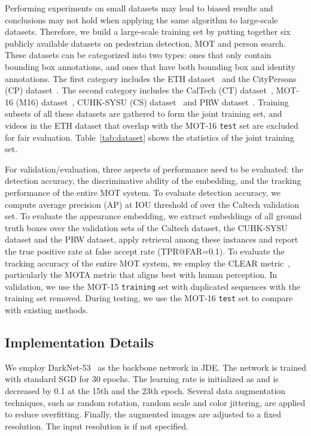 \documentclass[runningheads]{llncs}
\begin{document}
Performing experiments on small datasets may lead to biased results and conclusions may not hold when applying the same algorithm to large-scale datasets. 
Therefore, we build a large-scale training set by putting together six publicly available  datasets on pedestrian detection, MOT and person search. These datasets can be categorized into two types: ones that only contain bounding box annotations, and ones that have both bounding box and identity annotations. The first category includes the ETH dataset~\cite{eth} and the CityPersons (CP) dataset~\cite{citypersons}. The second category includes the CalTech (CT) dataset~\cite{caltech}, MOT-16 (M16) dataset~\cite{mot16}, CUHK-SYSU (CS) dataset~\cite{personsearch} and PRW dataset~\cite{prw}. Training subsets of all these datasets are gathered to form the joint training set, and videos in the ETH dataset that overlap with the MOT-16 \texttt{test} set are excluded for fair evaluation. 
Table~\ref{tab:dataset} shows the statistics of the joint training set.

For validation/evaluation, three aspects of performance need to be evaluated: the detection accuracy, the discriminative ability of the embedding, and the tracking performance of the entire MOT system. To evaluate detection accuracy, we compute average precision (AP) at IOU threshold of  over the Caltech validation set. To evaluate the appearance embedding, we extract embeddings of all ground truth boxes over the validation sets of the Caltech dataset, the CUHK-SYSU dataset and the PRW dataset, apply  retrieval among these instances and report the true positive rate at false accept rate  (TPR@FAR=0.1). To evaluate the tracking accuracy of the entire MOT system, we employ the CLEAR metric~\cite{CLEAR}, particularly the MOTA metric that aligns best with human perception. In validation, we use the MOT-15 \texttt{training} set with duplicated sequences with the training set removed. During testing, we use the MOT-16 \texttt{test} set to compare with existing methods.





\subsection{Implementation Details}
We employ DarkNet-53~\cite{yolov3} as the backbone network in JDE. The network is trained with standard SGD for 30 epochs. The learning rate is initialized as  and is decreased by 0.1 at the 15th and the 23th epoch. Several data augmentation techniques, such as random rotation, random scale and color jittering, are applied to reduce overfitting. Finally, the augmented images are adjusted to a fixed resolution. The input resolution is  if not specified.
\end{document}
